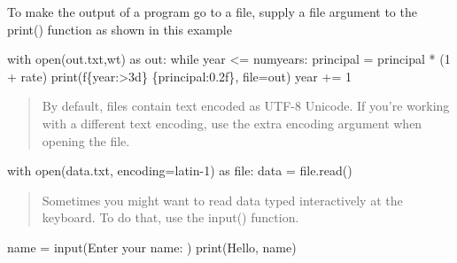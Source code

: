 \documentclass[
  letterpaper,
  DIV=11,
  numbers=noendperiod]{scrreprt}
\newenvironment{Shaded}{\begin{snugshade}}{\end{snugshade}}
\newcommand{\BuiltInTok}[1]{\textcolor[rgb]{0.00,0.46,0.62}{#1}}
\newcommand{\BuiltInTok}[1]{\textcolor[rgb]{0.00,0.48,0.65}{#1}}
\newcommand{\ControlFlowTok}[1]{\textcolor[rgb]{0.00,0.46,0.62}{#1}}
\newcommand{\ControlFlowTok}[1]{\textcolor[rgb]{0.00,0.48,0.65}{#1}}
\newcommand{\DecValTok}[1]{\textcolor[rgb]{0.68,0.00,0.00}{#1}}
\newcommand{\ImportTok}[1]{\textcolor[rgb]{0.00,0.46,0.62}{#1}}
\newcommand{\NormalTok}[1]{\textcolor[rgb]{0.00,0.46,0.62}{#1}}
\newcommand{\OperatorTok}[1]{\textcolor[rgb]{0.37,0.37,0.37}{#1}}
\newcommand{\ImportTok}[1]{\textcolor[rgb]{0.00,0.48,0.65}{#1}}
\newcommand{\NormalTok}[1]{\textcolor[rgb]{0.00,0.48,0.65}{#1}}
\newcommand{\OperatorTok}[1]{\textcolor[rgb]{0.37,0.37,0.37}{#1}}
\newcommand{\SpecialCharTok}[1]{\textcolor[rgb]{0.37,0.37,0.37}{#1}}
\newcommand{\SpecialStringTok}[1]{\textcolor[rgb]{0.13,0.47,0.30}{#1}}
\newcommand{\StringTok}[1]{\textcolor[rgb]{0.13,0.47,0.30}{#1}}
\begin{document}
\begin{Shaded}
\begin{Highlighting}[]
To make the output of a program go to a file, supply a file argument to
the print() function as shown in this example

\begin{Shaded}
\begin{Highlighting}[]
\ControlFlowTok{with} \BuiltInTok{open}\NormalTok{(}\StringTok{\textquotesingle{}out.txt\textquotesingle{}}\NormalTok{,}\StringTok{\textquotesingle{}wt\textquotesingle{}}\NormalTok{) }\ImportTok{as}\NormalTok{ out: }
    \ControlFlowTok{while}\NormalTok{ year  }\OperatorTok{\textless{}=}\NormalTok{  numyears: }
\NormalTok{          principal }\OperatorTok{=}\NormalTok{   principal   }\OperatorTok{*}\NormalTok{   (}\DecValTok{1}  \OperatorTok{+}\NormalTok{ rate)     }
          \BuiltInTok{print}\NormalTok{(}\SpecialStringTok{f\textquotesingle{}}\SpecialCharTok{\{}\NormalTok{year}\SpecialCharTok{:\textgreater{}3d\}}\SpecialStringTok{    }\SpecialCharTok{\{}\NormalTok{principal}\SpecialCharTok{:0.2f\}}\SpecialStringTok{\textquotesingle{}}\NormalTok{,  }\BuiltInTok{file}\OperatorTok{=}\NormalTok{out)}
\NormalTok{          year  }\OperatorTok{+=}  \DecValTok{1}
\end{Highlighting}
\end{Shaded}

\begin{quote}
By default, files contain text encoded as UTF-8 Unicode. If you're
working with a different text encoding, use the extra encoding argument
when opening the file.
\end{quote}

\begin{Shaded}
\begin{Highlighting}[]
\ControlFlowTok{with} \BuiltInTok{open}\NormalTok{(}\StringTok{\textquotesingle{}data.txt\textquotesingle{}}\NormalTok{, encoding}\OperatorTok{=}\StringTok{\textquotesingle{}latin{-}1\textquotesingle{}}\NormalTok{)   }\ImportTok{as}  \BuiltInTok{file}\NormalTok{:}
\NormalTok{    data }\OperatorTok{=} \BuiltInTok{file}\NormalTok{.read()}
\end{Highlighting}
\end{Shaded}

\begin{quote}
Sometimes you might want to read data typed interactively at the
keyboard. To do that, use the input() function.
\end{quote}

\begin{Shaded}
\begin{Highlighting}[]
\NormalTok{name }\OperatorTok{=}  \BuiltInTok{input}\NormalTok{(}\StringTok{\textquotesingle{}Enter your name: \textquotesingle{}}\NormalTok{) }
\BuiltInTok{print}\NormalTok{(}\StringTok{\textquotesingle{}Hello\textquotesingle{}}\NormalTok{,  name)}
\end{Highlighting}
\end{Shaded}


\end{Highlighting}
\end{Shaded}
\end{document}
